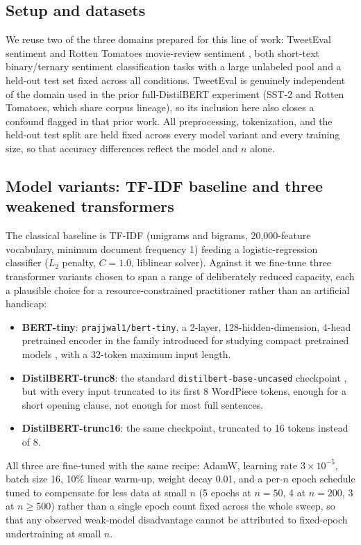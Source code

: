\documentclass[11pt,letterpaper]{article}
\begin{document}
\subsection{Setup and datasets}

We reuse two of the three domains prepared for this line of work: TweetEval sentiment \citep{Barbieri2020} and Rotten Tomatoes movie-review sentiment \citep{Pang2005}, both short-text binary/ternary sentiment classification tasks with a large unlabeled pool and a held-out test set fixed across all conditions. TweetEval is genuinely independent of the domain used in the prior full-DistilBERT experiment (SST-2 and Rotten Tomatoes, which share corpus lineage), so its inclusion here also closes a confound flagged in that prior work. All preprocessing, tokenization, and the held-out test split are held fixed across every model variant and every training size, so that accuracy differences reflect the model and $n$ alone.

\subsection{Model variants: TF-IDF baseline and three weakened transformers}

The classical baseline is TF-IDF (unigrams and bigrams, 20{,}000-feature vocabulary, minimum document frequency 1) feeding a logistic-regression classifier ($L_2$ penalty, $C{=}1.0$, liblinear solver). Against it we fine-tune three transformer variants chosen to span a range of deliberately reduced capacity, each a plausible choice for a resource-constrained practitioner rather than an artificial handicap:

\begin{itemize}
  \item \textbf{BERT-tiny}: \texttt{prajjwal1/bert-tiny}, a 2-layer, 128-hidden-dimension, 4-head pretrained encoder in the family introduced for studying compact pretrained models \citep{Turc2019}, with a 32-token maximum input length.
  \item \textbf{DistilBERT-trunc8}: the standard \texttt{distilbert-base-uncased} checkpoint \citep{Sanh2019}, but with every input truncated to its first 8 WordPiece tokens, enough for a short opening clause, not enough for most full sentences.
  \item \textbf{DistilBERT-trunc16}: the same checkpoint, truncated to 16 tokens instead of 8.
\end{itemize}

All three are fine-tuned with the same recipe: AdamW, learning rate $3\times10^{-5}$, batch size 16, 10\% linear warm-up, weight decay 0.01, and a per-$n$ epoch schedule tuned to compensate for less data at small $n$ (5 epochs at $n{=}50$, 4 at $n{=}200$, 3 at $n{\geq}500$) rather than a single epoch count fixed across the whole sweep, so that any observed weak-model disadvantage cannot be attributed to fixed-epoch undertraining at small $n$.
\end{document}
